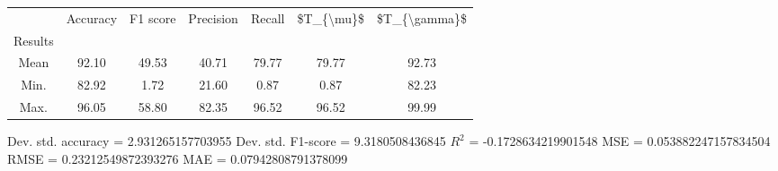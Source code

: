\begin{tabular}{|c|c|c|c|c|c|c|}
\toprule
{} &  Accuracy &  F1 score &  Precision &  Recall &  \$T\_\{\textbackslash mu\}\$ &  \$T\_\{\textbackslash gamma\}\$ \\
Results &           &           &            &         &            &               \\
\hline
Mean    &     92.10 &     49.53 &      40.71 &   79.77 &      79.77 &         92.73 \\
Min.    &     82.92 &      1.72 &      21.60 &    0.87 &       0.87 &         82.23 \\
Max.    &     96.05 &     58.80 &      82.35 &   96.52 &      96.52 &         99.99 \\
\bottomrule
\end{tabular}

 Dev. std. accuracy = 2.931265157703955
 Dev. std. F1-score = 9.3180508436845
 $R^2$ = -0.1728634219901548
 MSE = 0.053882247157834504
 RMSE = 0.23212549872393276
 MAE = 0.07942808791378099